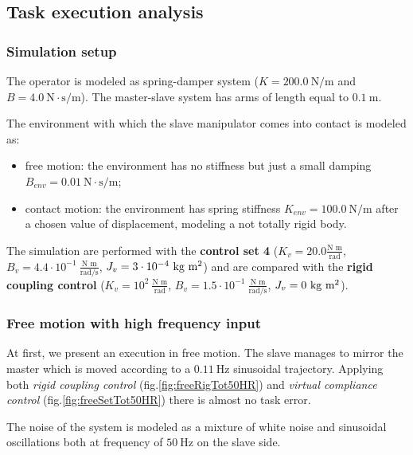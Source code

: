 \subsection{Task execution analysis}

\subsubsection*{Simulation setup}

The operator is modeled as spring-damper system ($ K=200.0 \ \text{N/m} $ and $ B=4.0 \ \text{N}\cdot\text{s}/\text{m} $). The master-slave system has arms of length equal to $ 0.1 \ \text{m} $. 

The environment with which the slave manipulator comes into contact is modeled as:
\begin{itemize}
	\item free motion: the environment has no stiffness but just a small damping $ B_{env}=0.01 \ \text{N}\cdot\text{s}/\text{m} $;
	\item contact motion: the environment has spring stiffness $ K_{env} = 100.0 \ \text{N/m} $ after a chosen value of displacement, modeling a not totally rigid body.
\end{itemize}

The simulation are performed with the \textbf{control set 4} ($ K_v = 20.0 \frac{\text{N m}}{\text{rad}} $, $ B_v = 4.4\cdot 10^{-1} \ \frac{\text{N m}}{\text{rad/s}}$, $ J_v = 3\cdot 10^{-4} \ \text{kg m\textsuperscript{2}}$) and are compared with the \textbf{rigid coupling control} ($K_v = 10^{2} \ \frac{\text{N m}}{\text{rad}} $, $B_v = 1.5\cdot 10^{-1} \ \frac{\text{N m}}{\text{rad/s}}$, $J_v =  0 \ \text{kg m\textsuperscript{2}} $).

\subsubsection{Free motion with high frequency input}

At first, we present an execution in free motion. The slave manages to mirror the master which is moved according to a $ 0.11 \ \text{Hz} $ sinusoidal trajectory. Applying both \textsl{rigid coupling control} (fig.\ref{fig:freeRigTot50HR}) and \textsl{virtual compliance control} (fig.\ref{fig:freeSetTot50HR}) there is almost no task error.

The noise of the system is modeled as a mixture of white noise and sinusoidal oscillations both at frequency of $50 \ \text{Hz}$ on the slave side.

